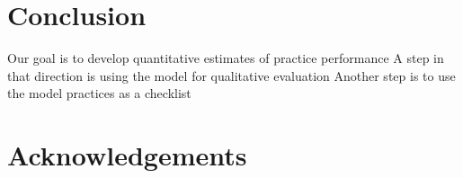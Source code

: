 \section{Conclusion}
\label{sec:conclusion}

	Our goal is to develop quantitative estimates of practice performance
	A step in that direction is using the model for qualitative evaluation
	Another step is to use the model practices as a checklist

\section{Acknowledgements}





